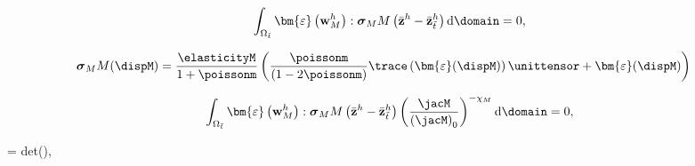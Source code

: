 \begin{align}
	\int_{\Omega_{\tilde{t}}} \bm{\varepsilon} \left(\mathbf{w}_{M}^h\right) : \boldsymbol{\sigma}_MM \left(\bar{\mathbf{z}}^h - \bar{\mathbf{z}}_{\tilde{t}}^h \right) \mathrm{d} \domain = 0,
	\label{eq:elasticity}
\end{align}

\begin{align}
	\boldsymbol{\sigma}_MM(\dispM)
	&=
	\frac{\elasticityM}{1+\poissonm}
	\left(
	\frac{\poissonm}{(1 - 2 \poissonm)}
	\trace\left(\bm{\varepsilon}(\dispM)\right)\unittensor
	+
	\bm{\varepsilon}(\dispM)
	\right)
\end{align}


\begin{align}
	\int_{\Omega_{\tilde{t}}} \bm{\varepsilon} \left(\mathbf{w}_{M}^h\right) : \boldsymbol{\sigma}_MM \left(\bar{\mathbf{z}}^h- \bar{\mathbf{z}}_{\tilde{t}}^h\right) \left(\frac{\jacM}{\left({\jacM}\right)_0}\right)^{-\chi_M} \mathrm{d} \domain = 0, 
	\label{eq:elasticityMJBS}
\end{align}

\jacM = det\left(\frac{\partial\postth}{\partial\adimensionalcoordinates}\right),